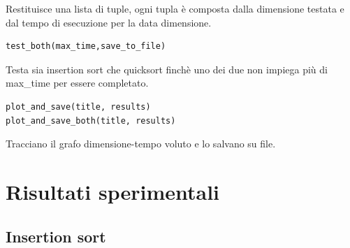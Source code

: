 \documentclass[]{article}
\begin{document}
Restituisce una lista di tuple, ogni tupla è composta dalla dimensione testata e dal tempo di esecuzione per la data dimensione.
\begin{verbatim}
test_both(max_time,save_to_file)
\end{verbatim}
Testa sia insertion sort che quicksort finchè uno dei due non impiega più di max\_time per essere completato.
\begin{verbatim}
plot_and_save(title, results)
plot_and_save_both(title, results)
\end{verbatim}
Tracciano il grafo dimensione-tempo voluto e lo salvano su file.
\section{Risultati sperimentali}
\subsection{Insertion sort}
\end{document}
